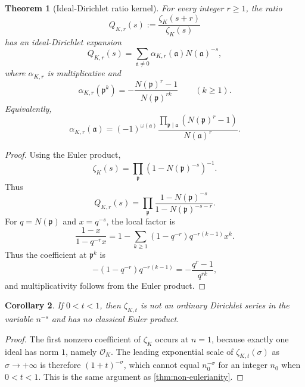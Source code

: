 \documentclass[11pt]{article}
\newcommand{\1}{\mathbf 1}
\newtheorem{theorem}{Theorem}[section]
\newtheorem{corollary}[theorem]{Corollary}
\numberwithin{equation}{section}
\begin{document}
\begin{theorem}[Ideal-Dirichlet ratio kernel]\label{thm:Dedekind-ratio}
For every integer $r\ge1$, the ratio
\begin{equation}
  Q_{K,r}(s):=\frac{\zeta_K(s+r)}{\zeta_K(s)}
\end{equation}
has an ideal-Dirichlet expansion
\begin{equation}
  Q_{K,r}(s)=\sum_{\mathfrak a\ne0}\alpha_{K,r}(\mathfrak a)N(\mathfrak a)^{-s},
\end{equation}
where $\alpha_{K,r}$ is multiplicative and
\begin{equation}
  \alpha_{K,r}(\mathfrak p^k)=-\frac{N(\mathfrak p)^r-1}{N(\mathfrak p)^{rk}}
  \qquad(k\ge1).
\end{equation}
Equivalently,
\begin{equation}
  \alpha_{K,r}(\mathfrak a)=(-1)^{\omega(\mathfrak a)}
  \frac{\prod_{\mathfrak p\mid\mathfrak a}(N(\mathfrak p)^r-1)}{N(\mathfrak a)^r}.
\end{equation}
\end{theorem}

\begin{proof}
Using the Euler product,
\begin{equation}
  \zeta_K(s)=\prod_{\mathfrak p}(1-N(\mathfrak p)^{-s})^{-1}.
\end{equation}
Thus
\begin{equation}
  Q_{K,r}(s)=\prod_{\mathfrak p}
  \frac{1-N(\mathfrak p)^{-s}}{1-N(\mathfrak p)^{-s-r}}.
\end{equation}
For $q=N(\mathfrak p)$ and $x=q^{-s}$, the local factor is
\begin{equation}
  \frac{1-x}{1-q^{-r}x}=1-\sum_{k\ge1}(1-q^{-r})q^{-r(k-1)}x^k.
\end{equation}
Thus the coefficient at $\mathfrak p^k$ is
\begin{equation}
  -(1-q^{-r})q^{-r(k-1)}=-\frac{q^r-1}{q^{rk}},
\end{equation}
and multiplicativity follows from the Euler product.
\end{proof}

\begin{corollary}\label{cor:Dedekind-nonEuler}
If $0<t<1$, then $\zeta_{K,t}$ is not an ordinary Dirichlet series in the variable $n^{-s}$ and has no classical Euler product.
\end{corollary}

\begin{proof}
The first nonzero coefficient of $\zeta_K$ occurs at $n=1$, because exactly one ideal has norm $1$, namely $\mathcal O_K$.  The leading exponential scale of $\zeta_{K,t}(\sigma)$ as $\sigma\to+\infty$ is therefore $(1+t)^{-\sigma}$, which cannot equal $n_0^{-\sigma}$ for an integer $n_0$ when $0<t<1$.  This is the same argument as \cref{thm:non-eulerianity}.
\end{proof}
\end{document}
